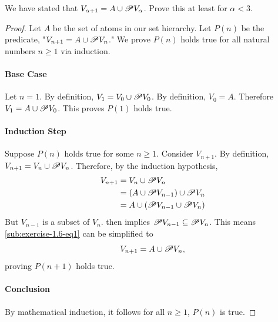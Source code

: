 \documentclass{report}
\begin{document}
We have stated that $V_{\alpha + 1} = A \cup \mathscr{P}V_\alpha$.
Prove this at least for $\alpha < 3$.

\begin{proof}

  Let $A$ be the set of atoms in our set hierarchy.
  Let $P(n)$ be the predicate, "$V_{n + 1} = A \cup \mathscr{P}V_n$."
  We prove $P(n)$ holds true for all natural numbers $n \geq 1$ via induction.

  \paragraph{Base Case}%

    Let $n = 1$.
    By definition, $V_1 = V_0 \cup \mathscr{P}V_0$.
    By definition, $V_0 = A$.
    Therefore $V_1 = A \cup \mathscr{P}V_0$.
    This proves $P(1)$ holds true.

  \paragraph{Induction Step}%

    Suppose $P(n)$ holds true for some $n \geq 1$.
    Consider $V_{n+1}$.
    By definition, $V_{n+1} = V_n \cup \mathscr{P}V_n$.
    Therefore, by the induction hypothesis,
      \begin{align}
        V_{n+1}
          & = V_n \cup \mathscr{P}V_n
            \nonumber \\
          & = (A \cup \mathscr{P}V_{n-1}) \cup \mathscr{P}V_n
            \nonumber \\
          & = A \cup (\mathscr{P}V_{n-1} \cup \mathscr{P}V_n)
            \label{sub:exercise-1.6-eq1}
      \end{align}
    But $V_{n-1}$ is a subset of $V_n$.
     then implies
      $\mathscr{P}V_{n-1} \subseteq \mathscr{P}V_n$.
    This means \eqref{sub:exercise-1.6-eq1} can be simplified to
      $$V_{n+1} = A \cup \mathscr{P}V_n,$$
    proving $P(n+1)$ holds true.

  \paragraph{Conclusion}%

    By mathematical induction, it follows for all $n \geq 1$, $P(n)$ is true.

\end{proof}

\subsection{}%
\label{sub:exercise-1.7}
\end{document}
